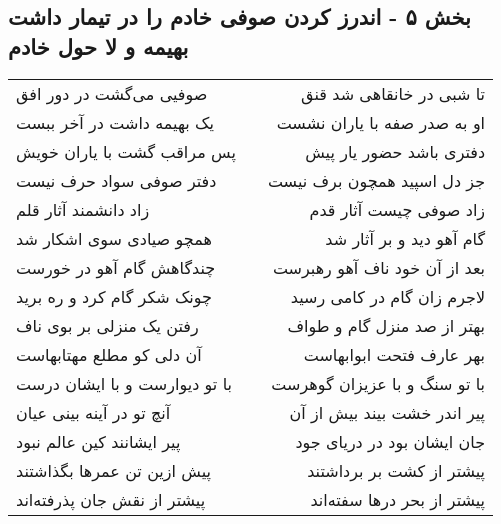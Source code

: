 \begin{center}
\section*{بخش ۵ - اندرز کردن صوفی خادم را در تیمار داشت بهیمه و لا حول خادم}
\label{sec:sh005}
\begin{longtable}{l p{0.5cm} r}
صوفیی می‌گشت در دور افق
&&
تا شبی در خانقاهی شد قنق
\\
یک بهیمه داشت در آخر ببست
&&
او به صدر صفه با یاران نشست
\\
پس مراقب گشت با یاران خویش
&&
دفتری باشد حضور یار پیش
\\
دفتر صوفی سواد حرف نیست
&&
جز دل اسپید همچون برف نیست
\\
زاد دانشمند آثار قلم
&&
زاد صوفی چیست آثار قدم
\\
همچو صیادی سوی اشکار شد
&&
گام آهو دید و بر آثار شد
\\
چندگاهش گام آهو در خورست
&&
بعد از آن خود ناف آهو رهبرست
\\
چونک شکر گام کرد و ره برید
&&
لاجرم زان گام در کامی رسید
\\
رفتن یک منزلی بر بوی ناف
&&
بهتر از صد منزل گام و طواف
\\
آن دلی کو مطلع مهتابهاست
&&
بهر عارف فتحت ابوابهاست
\\
با تو دیوارست و با ایشان درست
&&
با تو سنگ و با عزیزان گوهرست
\\
آنچ تو در آینه بینی عیان
&&
پیر اندر خشت بیند بیش از آن
\\
پیر ایشانند کین عالم نبود
&&
جان ایشان بود در دریای جود
\\
پیش ازین تن عمرها بگذاشتند
&&
پیشتر از کشت بر برداشتند
\\
پیشتر از نقش جان پذرفته‌اند
&&
پیشتر از بحر درها سفته‌اند
\\
\end{longtable}
\end{center}
